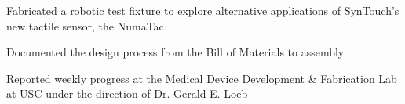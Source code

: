 \documentclass[letterpaper]{deedy-resume} %
\begin{document}
\begin{minipage}[t]{0.66\textwidth}

\vspace{\topsep} %

\begin{tightitemize}
\item Fabricated a robotic test fixture to explore alternative applications of SynTouch's new tactile sensor, the NumaTac
\item Documented the design process from the Bill of Materials to assembly
\item Reported weekly progress at the Medical Device Development \& Fabrication Lab at USC under the direction of Dr. Gerald E. Loeb 
\end{tightitemize}



\end{minipage} %








\end{document}
